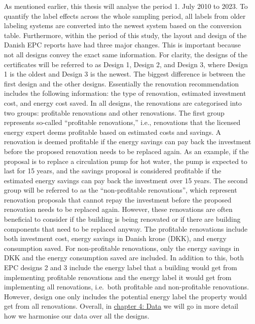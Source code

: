 \documentclass[
  letterpaper,
  DIV=11,
  numbers=noendperiod]{scrreprt}
\begin{document}
As mentioned earlier, this thesis will analyse the period 1. July 2010
to 2023. To quantify the label effects across the whole sampling period,
all labels from older labeling systems are converted into the newest
system based on the conversion table. Furthermore, within the period of
this study, the layout and design of the Danish EPC reports have had
three major changes. This is important because not all designs convey
the exact same information. For clarity, the designs of the certificates
will be referred to as Design 1, Design 2, and Design 3, where Design 1
is the oldest and Design 3 is the newest. The biggest difference is
between the first design and the other designs. Essentially the
renovation recommendation includes the following information: the type
of renovation, estimated investment cost, and energy cost saved. In all
designs, the renovations are categorised into two groups: profitable
renovations and other renovations. The first group represents so-called
``profitable renovations,'' i.e., renovations that the licensed energy
expert deems profitable based on estimated costs and savings. A
renovation is deemed profitable if the energy savings can pay back the
investment before the proposed renovation needs to be replaced again. As
an example, if the proposal is to replace a circulation pump for hot
water, the pump is expected to last for 15 years, and the savings
proposal is considered profitable if the estimated energy savings can
pay back the investment over 15 years. The second group will be referred
to as the ``non-profitable renovations'', which represent renovation
proposals that cannot repay the investment before the proposed
renovation needs to be replaced again. However, these renovations are
often beneficial to consider if the building is being renovated or if
there are building components that need to be replaced anyway. The
profitable renovations include both investment cost, energy savings in
Danish krone (DKK), and energy consumption saved. For non-profitable
renovations, only the energy savings in DKK and the energy consumption
saved are included. In addition to this, both EPC designs 2 and 3
include the energy label that a building would get from implementing
profitable renovations and the energy label it would get from
implementing all renovations, i.e.~both profitable and non-profitable
renovations. However, design one only includes the potential energy
label the property would get from all renovations. Overall, in
\href{data/data_housing.qmd}{chapter 4: Data} we will go in more detail
how we harmonise our data over all the designs.
\end{document}
